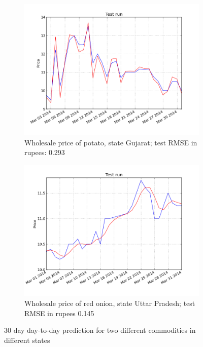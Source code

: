 \begin{figure}[!ht]
    \centering
        \begin{subfigure}[b]{.45\textwidth}
        \centering
        \includegraphics[width=\textwidth]{./img/plots/esn/daily/gujarat_potato_online_30d_1d.png}
        \caption{Wholesale price of potato, state Gujarat; test RMSE in rupees: 0.293} 
        \label{subfig:res_30d_1}
        \end{subfigure}
        \quad
        \begin{subfigure}[b]{.45\textwidth}
        \centering
        \includegraphics[width=\textwidth]{./img/plots/esn/daily/uttar_pradesh_redonion_30d_1d.png}
        \caption{Wholesale price of red onion, state Uttar Pradesh; test RMSE in rupees 0.145}
        \label{subfig:res_30d_2}
        \end{subfigure}
    \caption{30 day day-to-day prediction for two different commodities in different states}   
    \label{fig:res_30d}
\end{figure}

